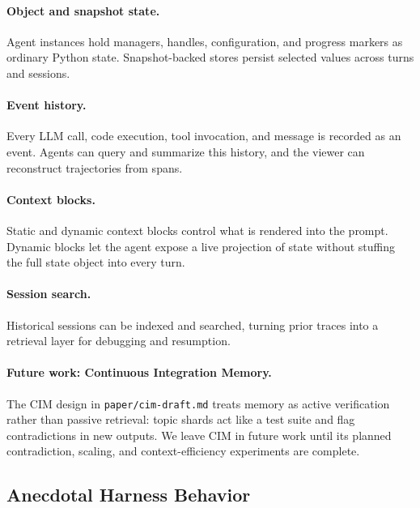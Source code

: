 \documentclass[11pt, logo, onecolumn, copyright, colorlinks=true, allcolors=blue]{nvidiatechreport}
\begin{document}
\paragraph{Object and snapshot state.} Agent instances hold managers, handles,
configuration, and progress markers as ordinary Python state. Snapshot-backed
stores persist selected values across turns and sessions.

\paragraph{Event history.} Every LLM call, code execution, tool invocation, and
message is recorded as an event. Agents can query and summarize this history,
and the viewer can reconstruct trajectories from spans.

\paragraph{Context blocks.} Static and dynamic context blocks control what is
rendered into the prompt. Dynamic blocks let the agent expose a live projection
of state without stuffing the full state object into every turn.

\paragraph{Session search.} Historical sessions can be indexed and searched,
turning prior traces into a retrieval layer for debugging and resumption.

\paragraph{Future work: Continuous Integration Memory.} The CIM design in
\texttt{paper/cim-draft.md} treats memory as active verification rather than
passive retrieval: topic shards act like a test suite and flag contradictions in
new outputs. We leave CIM in future work until its planned contradiction,
scaling, and context-efficiency experiments are complete.


\subsection{Anecdotal Harness Behavior}
\label{sec:anecdotal}
\end{document}
